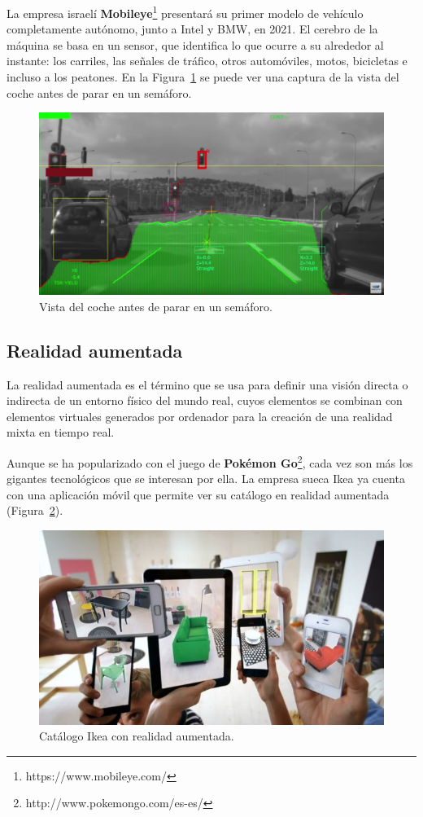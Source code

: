 La empresa israelí \textbf{Mobileye}\footnote{https://www.mobileye.com/} presentará su primer modelo de vehículo completamente autónomo, junto a Intel y BMW, en 2021. El cerebro de la máquina se basa en un sensor, que identifica lo que ocurre a su alrededor al instante: los carriles, las señales de tráfico, otros automóviles, motos, bicicletas e incluso a los peatones. En la Figura~\ref{fig:Car} se puede ver una captura de la vista del coche antes de parar en un semáforo.

\begin{figure}[th]
\centering
\includegraphics[scale=0.3]{Figures/car.png}
\decoRule
\caption[Car]{Vista del coche antes de parar en un semáforo.}
\label{fig:Car}
\end{figure}

\subsection{Realidad aumentada}

La realidad aumentada es el término que se usa para definir una visión directa o indirecta de un entorno físico del mundo real, cuyos elementos se combinan con elementos virtuales generados por ordenador para la creación de una realidad mixta en tiempo real.

Aunque se ha popularizado con el juego de \textbf{Pokémon Go}\footnote{http://www.pokemongo.com/es-es/}, cada vez son más los gigantes tecnológicos que se interesan por ella. La empresa sueca Ikea ya cuenta con una aplicación móvil que permite ver su catálogo en realidad aumentada (Figura~\ref{fig:Ikea}).

\begin{figure}[th]
\centering
\includegraphics[scale=0.7]{Figures/ikea.jpg}
\decoRule
\caption[Ikea]{Catálogo Ikea con realidad aumentada.}
\label{fig:Ikea}
\end{figure}

